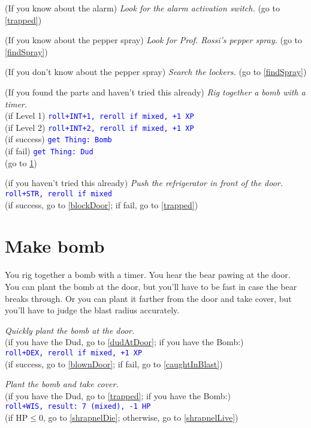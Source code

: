 \documentclass[12pt]{article}
\begin{document}
(If you know about the alarm) \textit{Look for the alarm activation switch.} (go to \ref{trapped})

(If you know about the pepper spray) \textit{Look for Prof. Rossi's pepper spray.}
(go to \ref{findSpray})

(If you don't know about the pepper spray) \textit{Search the lockers.} (go to
\ref{findSpray})

(If you found the parts and haven't tried this already) \textit{Rig together a bomb with a timer.}\\
(if Level 1) \texttt{\textcolor{blue}{roll+INT+1, reroll if mixed, +1 XP}}\\
(if Level 2) \texttt{\textcolor{blue}{roll+INT+2, reroll if mixed, +1 XP}}\\
(if success) \texttt{\textcolor{blue}{get Thing:~Bomb}}\\
(if fail) \texttt{\textcolor{blue}{get Thing:~Dud}}\\
(go to \ref{makeBomb})

(if you haven't tried this already) \textit{Push the refrigerator in front of the door.}\\
\textcolor{blue}{\texttt{roll+STR, reroll if mixed}}\\
(if success, go to \ref{blockDoor}; if fail, go to \ref{trapped})

\section{Make bomb}\label{makeBomb}

You rig together a bomb with a timer. You hear the bear pawing at the door. You can plant the bomb at the door, but you'll have to be fast in case the bear breaks through. Or you can plant it farther from the door and take cover, but you'll have to judge the blast radius accurately.

\textit{Quickly plant the bomb at the door.}\\
(if you have the Dud, go to \ref{dudAtDoor}; if you have the Bomb:)\\
\texttt{\textcolor{blue}{roll+DEX, reroll if mixed, +1 XP}}\\
(if success, go to \ref{blownDoor}; if fail, go to \ref{caughtInBlast})

\textit{Plant the bomb and take cover.}\\
(if you have the Dud, go to \ref{trapped}; if you have the Bomb:)\\
\texttt{\textcolor{blue}{roll+WIS, result:~7 (mixed), -1 HP}}\\
(if $\text{HP} \le 0$, go to \ref{shrapnelDie}; otherwise, go to \ref{shrapnelLive})
\end{document}
